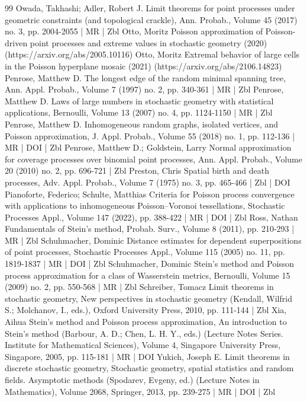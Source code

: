 \begin{thebibliography}{99}
Owada, Takhashi; Adler, Robert J. Limit theorems for point processes under geometric constraints (and topological crackle), Ann. Probab., Volume 45 (2017) no. 3, pp. 2004-2055 | MR | Zbl
Otto, Moritz Poisson approximation of Poisson-driven point processes and extreme values in stochastic geometry (2020) (https://arxiv.org/abs/2005.10116)
Otto, Moritz Extremal behavior of large cells in the Poisson hyperplane mosaic (2021) (https://arxiv.org/abs/2106.14823)
Penrose, Matthew D. The longest edge of the random minimal spanning tree, Ann. Appl. Probab., Volume 7 (1997) no. 2, pp. 340-361 | MR | Zbl
Penrose, Matthew D. Laws of large numbers in stochastic geometry with statistical applications, Bernoulli, Volume 13 (2007) no. 4, pp. 1124-1150 | MR | Zbl
Penrose, Matthew D. Inhomogeneous random graphs, isolated vertices, and Poisson approximation, J. Appl. Probab., Volume 55 (2018) no. 1, pp. 112-136 | MR | DOI | Zbl
Penrose, Matthew D.; Goldstein, Larry Normal approximation for coverage processes over binomial point processes, Ann. Appl. Probab., Volume 20 (2010) no. 2, pp. 696-721 | Zbl
Preston, Chris Spatial birth and death processes, Adv. Appl. Probab., Volume 7 (1975) no. 3, pp. 465-466 | Zbl | DOI
Pianoforte, Federico; Schulte, Matthias Criteria for Poisson process convergence with applications to inhomogeneous Poisson–Voronoi tessellations, Stochastic Processes Appl., Volume 147 (2022), pp. 388-422 | MR | DOI | Zbl
Ross, Nathan Fundamentals of Stein’s method, Probab. Surv., Volume 8 (2011), pp. 210-293 | MR | Zbl
Schuhmacher, Dominic Distance estimates for dependent superpositions of point processes, Stochastic Processes Appl., Volume 115 (2005) no. 11, pp. 1819-1837 | MR | DOI | Zbl
Schuhmacher, Dominic Stein’s method and Poisson process approximation for a class of Wasserstein metrics, Bernoulli, Volume 15 (2009) no. 2, pp. 550-568 | MR | Zbl
Schreiber, Tomacz Limit theorems in stochastic geometry, New perspectives in stochastic geometry (Kendall, Wilfrid S.; Molchanov, I., eds.), Oxford University Press, 2010, pp. 111-144 | Zbl
Xia, Aihua Stein’s method and Poisson process approximation, An introduction to Stein’s method (Barbour, A. D.; Chen, L. H. Y., eds.) (Lecture Notes Series. Institute for Mathematical Sciences), Volume 4, Singapore University Press, Singapore, 2005, pp. 115-181 | MR | DOI
Yukich, Joseph E. Limit theorems in discrete stochastic geometry, Stochastic geometry, spatial statistics and random fields. Asymptotic methods (Spodarev, Evgeny, ed.) (Lecture Notes in Mathematics), Volume 2068, Springer, 2013, pp. 239-275 | MR | DOI | Zbl
\end{thebibliography}
